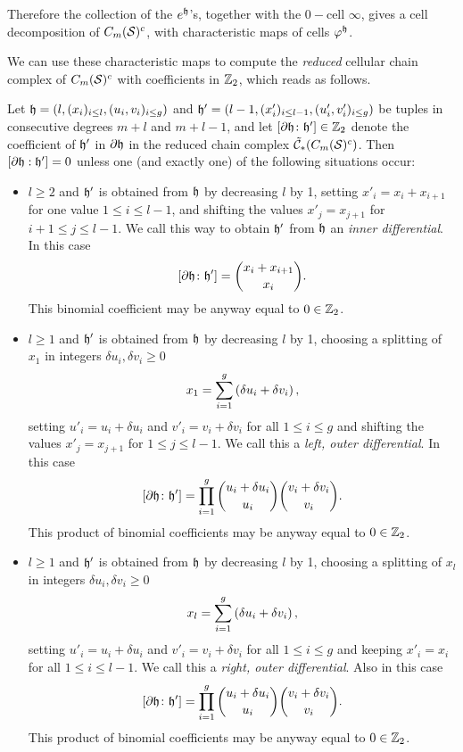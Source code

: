 Therefore the collection of the $e^{\mathfrak{h}}$'s, together with the $0-$cell $\infty$,
gives a cell decomposition of $C_m(\mathcal{S})^c$, with characteristic maps of cells $\varphi^{\mathfrak{h}}$.

We can use these characteristic maps to compute the \emph{reduced} cellular chain complex of $C_m(\mathcal{S})^c$
with coefficients in $\mathbb{Z}_2$, which
reads as follows.
\begin{lem}
\label{lem:doperatoropenmodtwo}
Let $\mathfrak{h}=(l,(x_i)_{i\leq l},(u_i,v_i)_{i\leq g})$ and
$\mathfrak{h}'=(l-1,(x'_i)_{i\leq l-1},(u'_i,v'_i)_{i\leq g})$
be tuples in consecutive degrees $m+l$ and $m+l-1$, and let $[\partial \mathfrak{h}\colon\mathfrak{h}']\in\mathbb{Z}_2$ denote the coefficient
of $\mathfrak{h}'$ in $\partial \mathfrak{h}$ in the reduced chain complex $\tilde{\mathcal{C}}_*(C_m(\mathcal{S})^c)$.
Then $[\partial \mathfrak{h}:\mathfrak{h}']=0$ unless one (and exactly one) of the following situations occur:
\begin{itemize}
 \item $l\geq 2$ and $\mathfrak{h}'$ is obtained from $\mathfrak{h}$ by decreasing $l$ by 1, setting $x'_i=x_i+x_{i+1}$
 for one value $1\leq i\leq l-1$, and shifting the values
 $x'_j=x_{j+1}$ for $i+1\leq j\leq l-1$. We call this way to obtain $\mathfrak{h}'$ from $\mathfrak{h}$ an \emph{inner differential}.
 In this case
 \[
  [\partial \mathfrak{h}\colon\mathfrak{h}']=\binom{x_i+x_{i+1}}{x_i}.
 \]
 This binomial coefficient may be anyway equal to $0\in\mathbb{Z}_2$.
 \item $l\geq 1$ and $\mathfrak{h}'$ is obtained from $\mathfrak{h}$ by decreasing $l$ by 1, choosing a splitting of $x_1$
 in integers $\delta u_i,\delta v_i\geq 0$
 \[
  x_1=\sum_{i=1}^g \left(\delta u_i+\delta v_i\right),
 \]
 setting $u'_i=u_i+\delta u_i$ and $v'_i=v_i+\delta v_i$ for all $1\leq i\leq g$ and shifting the values
 $x'_j=x_{j+1}$ for $1\leq j\leq l-1$. We call this a \emph{left, outer differential}. In this case
 \[
  [\partial \mathfrak{h}\colon\mathfrak{h}']=\prod_{i=1}^g\binom{u_i+\delta u_i}{u_i}\binom{v_i+\delta v_i}{v_i}.
 \]
 This product of binomial coefficients may be anyway equal to $0\in\mathbb{Z}_2$.
 \item $l\geq 1$ and $\mathfrak{h}'$ is obtained from $\mathfrak{h}$ by decreasing $l$ by 1, choosing a splitting of $x_l$
 in integers $\delta u_i,\delta v_i\geq 0$
 \[
  x_l=\sum_{i=1}^g \left(\delta u_i+\delta v_i\right),
 \]
 setting $u'_i=u_i+\delta u_i$ and $v'_i=v_i+\delta v_i$ for all $1\leq i\leq g$ and keeping $x'_i=x_i$ for all $1\leq i\leq l-1$.
 We call this a \emph{right, outer differential}. Also in this case
 \[
  [\partial \mathfrak{h}\colon\mathfrak{h}']=\prod_{i=1}^g\binom{u_i+\delta u_i}{u_i}\binom{v_i+\delta v_i}{v_i}.
 \]
 This product of binomial coefficients may be anyway equal to $0\in\mathbb{Z}_2$.
\end{itemize}
\end{lem}
